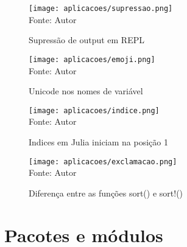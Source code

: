  
    \begin{figure}[H]%
    \begin{center}
        \label{supressao}
        \caption{Supressão de output em REPL} %
        \texttt{[image: aplicacoes/supressao.png]} \\
        {\tiny \sf Fonte: Autor}
    \end{center}
    \end{figure} 

    \begin{figure}[H]%
      \begin{center}
        \label{emoji}
        \caption{Unicode nos nomes de variável} 
        \texttt{[image: aplicacoes/emoji.png]} \\
        {\tiny \sf Fonte: Autor}
    \end{center}
    \end{figure} 

    \begin{figure}[H]%
    \begin{center}
        \label{indice}
        \caption{Indices em Julia iniciam na posição 1} 
        \texttt{[image: aplicacoes/indice.png]} \\
        {\tiny \sf Fonte: Autor}
    \end{center}
    \end{figure} 

    \begin{figure}[H]%
    \begin{center}
      \label{exclamacao}
      \caption{Diferença entre as funções sort() e sort!()} 
        \texttt{[image: aplicacoes/exclamacao.png]} \\
        {\tiny \sf Fonte: Autor}
    \end{center}
    \end{figure} 

\section{Pacotes e módulos}

